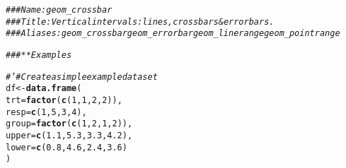 \documentclass[a4paper,titlepage]{tufte-handout}\usepackage[]{graphicx}\usepackage[]{color}
\makeatletter
\newcommand{\hlnum}[1]{\textcolor[rgb]{0.686,0.059,0.569}{#1}}%
\newcommand{\hlcom}[1]{\textcolor[rgb]{0.678,0.584,0.686}{\textit{#1}}}%
\newcommand{\hlstd}[1]{\textcolor[rgb]{0.345,0.345,0.345}{#1}}%
\newcommand{\hlkwb}[1]{\textcolor[rgb]{0.69,0.353,0.396}{#1}}%
\newcommand{\hlkwc}[1]{\textcolor[rgb]{0.333,0.667,0.333}{#1}}%
\newcommand{\hlkwd}[1]{\textcolor[rgb]{0.737,0.353,0.396}{\textbf{#1}}}%
\newenvironment{kframe}{%
 \def\at@end@of@kframe{}%
 \ifinner\ifhmode%
  \def\at@end@of@kframe{\end{minipage}}%
  \begin{minipage}{\columnwidth}%
 \fi\fi%
 \def\FrameCommand##1{\hskip\@totalleftmargin \hskip-\fboxsep
 \colorbox{shadecolor}{##1}\hskip-\fboxsep
     \hskip-\linewidth \hskip-\@totalleftmargin \hskip\columnwidth}%
 \MakeFramed {\advance\hsize-\width
   \@totalleftmargin\z@ \linewidth\hsize
   \@setminipage}}%
 {\par\unskip\endMakeFramed%
 \at@end@of@kframe}
\newenvironment{knitrout}{}{} %
\makeatother
\begin{document}
\begin{knitrout}
\color{fgcolor}\begin{kframe}
\begin{alltt}
\hlcom{### Name: geom_crossbar}
\hlcom{### Title: Vertical intervals: lines, crossbars & errorbars.}
\hlcom{### Aliases: geom_crossbar geom_errorbar geom_linerange geom_pointrange}

\hlcom{### ** Examples}

\hlcom{#' # Create a simple example dataset}
\hlstd{df} \hlkwb{<-} \hlkwd{data.frame}\hlstd{(}
  \hlkwc{trt} \hlstd{=} \hlkwd{factor}\hlstd{(}\hlkwd{c}\hlstd{(}\hlnum{1}\hlstd{,} \hlnum{1}\hlstd{,} \hlnum{2}\hlstd{,} \hlnum{2}\hlstd{)),}
  \hlkwc{resp} \hlstd{=} \hlkwd{c}\hlstd{(}\hlnum{1}\hlstd{,} \hlnum{5}\hlstd{,} \hlnum{3}\hlstd{,} \hlnum{4}\hlstd{),}
  \hlkwc{group} \hlstd{=} \hlkwd{factor}\hlstd{(}\hlkwd{c}\hlstd{(}\hlnum{1}\hlstd{,} \hlnum{2}\hlstd{,} \hlnum{1}\hlstd{,} \hlnum{2}\hlstd{)),}
  \hlkwc{upper} \hlstd{=} \hlkwd{c}\hlstd{(}\hlnum{1.1}\hlstd{,} \hlnum{5.3}\hlstd{,} \hlnum{3.3}\hlstd{,} \hlnum{4.2}\hlstd{),}
  \hlkwc{lower} \hlstd{=} \hlkwd{c}\hlstd{(}\hlnum{0.8}\hlstd{,} \hlnum{4.6}\hlstd{,} \hlnum{2.4}\hlstd{,} \hlnum{3.6}\hlstd{)}
\hlstd{)}


\end{alltt}
\end{kframe}
\end{knitrout}
\end{document}
